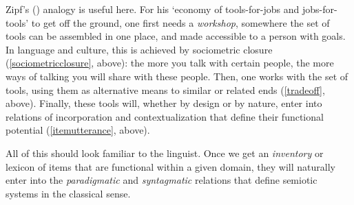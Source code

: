 Zipf's (\citeyear{zipf_human_1949}) analogy is useful here. For his \textquoteleft economy of tools-for-jobs 
and jobs-for-tools' to get off the ground, one first needs a \textit{workshop}, somewhere the set of tools can be assembled in one place, 
and made accessible to a person with goals. In language and 
culture, this is achieved by sociometric closure (\ref{sociometricclosure}, above): the more you talk with certain people, the more ways of talking you will share with these people. 
Then, one works with the set of tools, using them as alternative 
means to similar or related ends (\ref{tradeoff}, above). Finally, these tools will, whether 
by design or by nature, enter into relations of incorporation and 
contextualization that define their functional potential (\ref{itemutterance}, 
above). 



All of this should look familiar to the linguist. Once we get an \textit{inventory} or lexicon of items that are 
functional within a given domain, they will naturally enter into the 
\textit{paradigmatic} and \textit{syntagmatic} relations that 
define semiotic systems in the classical sense.









\newpage